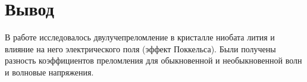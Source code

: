 \section{Вывод}
В работе исследовалось двулучепреломление в кристалле ниобата лития и влияние на него электрического поля (эффект Поккельса). Были получены разность коэффициентов преломления для обыкновенной и необыкновенной волн и волновые напряжения.
